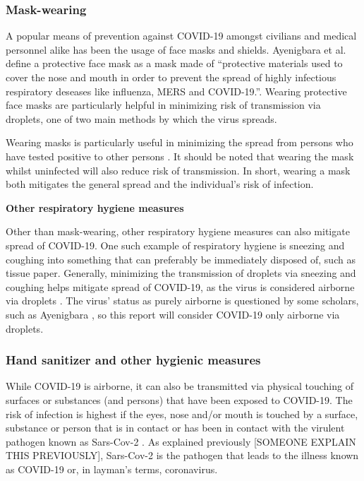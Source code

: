 \subsubsection{Mask-wearing}

A popular means of prevention against COVID-19 amongst civilians and medical personnel alike has been the usage of face masks and shields. Ayenigbara et al. define a protective face mask as a mask made of ``protective materials used to cover the nose and mouth in order to prevent the spread of highly infectious respiratory deseases like influenza, MERS and COVID-19.''\citep{ayenigbara_covid-19_2020}. Wearing protective face masks are particularly helpful in minimizing risk of transmission via droplets, one of two main methods by which the virus spreads.

Wearing masks is particularly useful in minimizing the spread from persons who have tested positive to other persons \citep{ayenigbara_covid-19_2020}. It should be noted that wearing the mask whilst uninfected will also reduce risk of transmission. In short, wearing a mask both mitigates the general spread and the individual's risk of infection.



\textbf{Other respiratory hygiene measures}

Other than mask-wearing, other respiratory hygiene measures can also mitigate spread of COVID-19. One such example of respiratory hygiene is sneezing and coughing into something that can preferably be immediately disposed of, such as tissue paper. Generally, minimizing the transmission of droplets via sneezing and coughing helps mitigate spread of COVID-19, as the virus is considered airborne via droplets \citep{zhang_identifying_2020}. The virus' status as purely airborne is questioned by some scholars, such as Ayenigbara \citep{ayenigbara_covid-19_2020}, so this report will consider COVID-19 only airborne via droplets.




\subsubsection{Hand sanitizer and other hygienic measures}
While COVID-19 is airborne, it can also be transmitted via physical touching of surfaces or substances (and persons) that have been exposed to COVID-19. The risk of infection is highest if the eyes, nose and/or mouth is touched by a surface, substance or person that is in contact or has been in contact with the virulent pathogen known as Sars-Cov-2 \citep{ayenigbara_covid-19_2020}. As explained previously [SOMEONE EXPLAIN THIS PREVIOUSLY], Sars-Cov-2 is the pathogen that leads to the illness known as COVID-19 or, in layman's terms, coronavirus.

